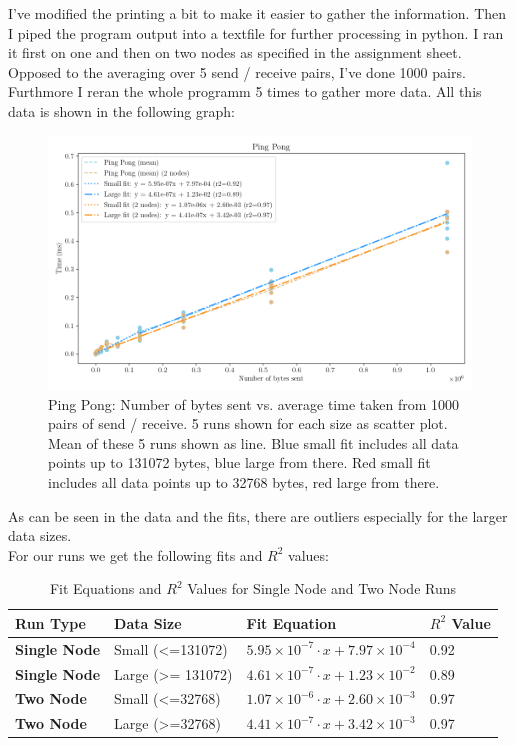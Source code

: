 I've modified the printing a bit to make it easier to gather the information. 
Then I piped the program output into a textfile for further processing in python. I ran it first on one and then on two nodes as specified in the assignment sheet. Opposed to the averaging over 5 send / receive pairs, I've done 1000 pairs. Furthmore I reran the whole programm 5 times to gather more data. 
All this data is shown in the following graph: 
\begin{figure}[H]
    \centering
    \includegraphics[width=\textwidth]{../fig/lab0/pingPong.png}
    \caption{Ping Pong: Number of bytes sent vs. average time taken from 1000 pairs of send / receive. 5 runs shown for each size as scatter plot. Mean of these 5 runs shown as line. Blue small fit includes all data points up to 131072 bytes, blue large from there. Red small fit includes all data points up to 32768 bytes, red large from there.}
    \label{fig:pingpong}
\end{figure}
As can be seen in the data and the fits, there are outliers especially for the larger data sizes. \\
For our runs we get the following fits and $R^2$ values:
\begin{table}[h!]
    \centering
    \begin{tabular}{|l|l|l|l|}
        \hline
        \textbf{Run Type}   & \textbf{Data Size} & \textbf{Fit Equation}                                      & \textbf{$R^2$ Value} \\ \hline
        \textbf{Single Node} & Small (<=131072)             & $5.95 \times 10^{-7} \cdot x + 7.97 \times 10^{-4}$        & 0.92              \\ \hline
        \textbf{Single Node} & Large (>= 131072)& $4.61 \times 10^{-7} \cdot x + 1.23 \times 10^{-2}$        & 0.89              \\ \hline
        \textbf{Two Node}    & Small (<=32768)& $1.07 \times 10^{-6} \cdot x + 2.60 \times 10^{-3}$        & 0.97              \\ \hline
        \textbf{Two Node}    & Large (>=32768)   & $4.41 \times 10^{-7} \cdot x + 3.42 \times 10^{-3}$        & 0.97              \\ \hline
    \end{tabular}
    \caption{Fit Equations and $R^2$ Values for Single Node and Two Node Runs}
\end{table}

